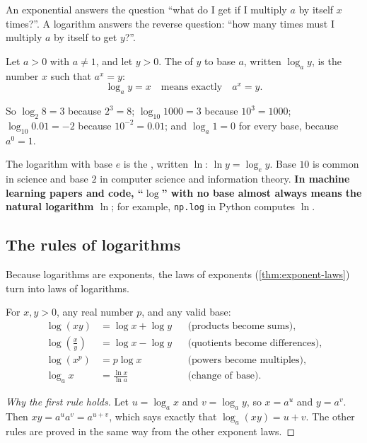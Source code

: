 An exponential answers the question ``what do I get if I multiply $a$ by
itself $x$ times?''. A logarithm answers the reverse question: ``how many
times must I multiply $a$ by itself to get $y$?''.

\begin{definition}[Logarithm]\label{def:logarithm}
Let $a > 0$ with $a \neq 1$, and let $y > 0$. The  of $y$ to
base $a$, written $\log_a y$, is the number $x$ such that $a^x = y$:
\[
  \log_a y = x \quad\text{means exactly}\quad a^x = y .
\]
\end{definition}

So $\log_2 8 = 3$ because $2^3 = 8$; $\log_{10} 1000 = 3$ because
$10^3 = 1000$; $\log_{10} 0.01 = -2$ because $10^{-2} = 0.01$; and
$\log_a 1 = 0$ for every base, because $a^0 = 1$.

\begin{notation}
The logarithm with base $e$ is the , written $\ln$:
$\ln y = \log_e y$. Base $10$ is common in science and base $2$ in computer
science and information theory. \textbf{In machine learning papers and code,
``$\log$'' with no base almost always means the natural logarithm $\ln$}; for
example, \texttt{np.log} in Python computes $\ln$.
\end{notation}

\subsection{The rules of logarithms}

Because logarithms are exponents, the laws of exponents
(\cref{thm:exponent-laws}) turn into laws of logarithms.

\begin{theorem}\label{thm:log-laws}
For $x, y > 0$, any real number $p$, and any valid base:
\begin{align*}
  \log(xy) &= \log x + \log y
    && \text{(products become sums)},\\
  \log\left(\tfrac{x}{y}\right) &= \log x - \log y
    && \text{(quotients become differences)},\\
  \log\left(x^p\right) &= p\log x
    && \text{(powers become multiples)},\\
  \log_a x &= \frac{\ln x}{\ln a}
    && \text{(change of base)}.
\end{align*}
\end{theorem}

\begin{proof}[Why the first rule holds]
Let $u = \log_a x$ and $v = \log_a y$, so $x = a^u$ and $y = a^v$. Then
$xy = a^u a^v = a^{u+v}$, which says exactly that $\log_a(xy) = u + v$. The
other rules are proved in the same way from the other exponent laws.
\end{proof}

